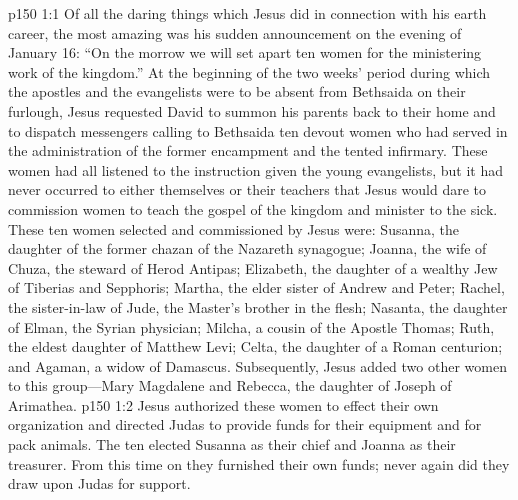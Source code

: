 \vs p150 1:1 Of all the daring things which Jesus did in connection with his earth career, the most amazing was his sudden announcement on the evening of January 16: \textcolor{ubdarkred}{“On the morrow we will set apart ten women for the ministering work of the kingdom.”} At the beginning of the two weeks’ period during which the apostles and the evangelists were to be absent from Bethsaida on their furlough, Jesus requested David to summon his parents back to their home and to dispatch messengers calling to Bethsaida ten devout women who had served in the administration of the former encampment and the tented infirmary. These women had all listened to the instruction given the young evangelists, but it had never occurred to either themselves or their teachers that Jesus would dare to commission women to teach the gospel of the kingdom and minister to the sick. These ten women selected and commissioned by Jesus were: Susanna, the daughter of the former chazan of the Nazareth synagogue; Joanna, the wife of Chuza, the steward of Herod Antipas; Elizabeth, the daughter of a wealthy Jew of Tiberias and Sepphoris; Martha, the elder sister of Andrew and Peter; Rachel, the sister\hyp{}in\hyp{}law of Jude, the Master’s brother in the flesh; Nasanta, the daughter of Elman, the Syrian physician; Milcha, a cousin of the Apostle Thomas; Ruth, the eldest daughter of Matthew Levi; Celta, the daughter of a Roman centurion; and Agaman, a widow of Damascus. Subsequently, Jesus added two other women to this group---Mary Magdalene and Rebecca, the daughter of Joseph of Arimathea.
\vs p150 1:2 Jesus authorized these women to effect their own organization and directed Judas to provide funds for their equipment and for pack animals. The ten elected Susanna as their chief and Joanna as their treasurer. From this time on they furnished their own funds; never again did they draw upon Judas for support.
